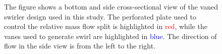 \begin{figure}
\begin{tikzpicture}
\end{tikzpicture}

\caption[Schematic of a vaned swirler]{The figure shows a bottom and side cross-sectional view of the vaned swirler design used in this study. The perforated plate used to control the relative mass flow split is highlighted in \textcolor{red}{red}, while the vanes used to generate swirl are highlighted in \textcolor{blue}{blue}. The direction of flow in the side view is from the left to the right.}

\label{fig:swirler}

\end{figure}

